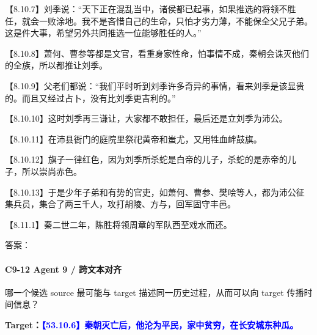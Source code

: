 \documentclass[fontset=none,11pt,a4paper]{ctexart}
\newcommand{\answerline}[1]{\underline{\hspace{#1}}}
\begin{document}
\begin{enumerate}[label=\Alph*.]
\noindent 【8.10.7】刘季说：“天下正在混乱当中，诸侯都已起事，如果推选的将领不胜任，就会一败涂地。我不是吝惜自己的生命，只怕才劣力薄，不能保全父兄子弟。这是件大事，希望另外共同推选一位能够胜任的人。”\par
\noindent 【8.10.8】萧何、曹参等都是文官，看重身家性命，怕事情不成，秦朝会诛灭他们的全族，所以都推让刘季。\par
\noindent 【8.10.9】父老们都说：“我们平时听到刘季许多奇异的事情，看来刘季是该显贵的。而且又经过占卜，没有比刘季更吉利的。”\par
\noindent 【8.10.10】这时刘季再三谦让，大家都不敢担任，最后还是立刘季为沛公。\par
\noindent 【8.10.11】在沛县衙门的庭院里祭祀黄帝和蚩尤，又用牲血衅鼓旗。\par
\noindent 【8.10.12】旗子一律红色，因为刘季所杀蛇是白帝的儿子，杀蛇的是赤帝的儿子，所以崇尚赤色。\par
\noindent 【8.10.13】于是少年子弟和有势的官吏，如萧何、曹参、樊哙等人，都为沛公征集兵员，集合了两三千人，攻打胡陵、方与，回军固守丰邑。\par
\noindent 【8.11.1】秦二世二年，陈胜将领周章的军队西至戏水而还。\par
\end{enumerate}
答案：\answerline{2.2cm}

\paragraph{C9-12 \quad Agent 9 / 跨文本对齐}
哪一个候选 source 最可能与 target 描述同一历史过程，从而可以向 target 传播时间信息？

\textbf{Target：}\textcolor{blue}{\textbf{【53.10.6】秦朝灭亡后，他沦为平民，家中贫穷，在长安城东种瓜。}}
\end{document}
